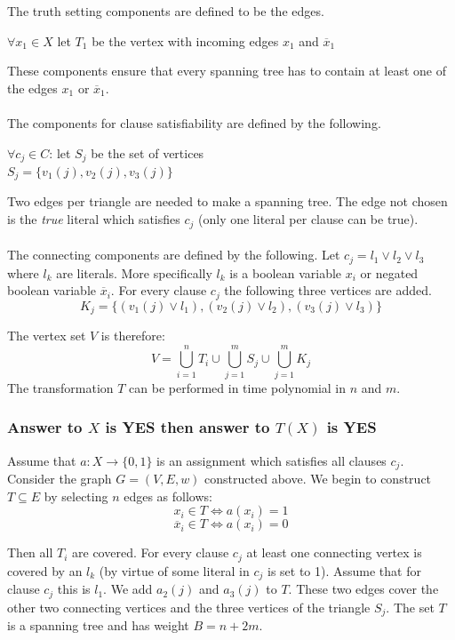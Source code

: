 \documentclass[12pt]{report}
\begin{document}
The truth setting components are defined to be the edges.
\begin{center}
	$\forall x_1 \in X$ let $T_1$ be the vertex with incoming edges $x_1$ and $\overline{x}_1$
\end{center}
These components ensure that every spanning tree has to contain at least one of the edges $x_1$ or $\overline{x}_1$.\\
\\
The components for clause satisfiability are defined by the following.
\begin{center}
	$\forall c_j \in C$: let $S_j$ be the set of vertices\\
	$S_j  = \{v_1(j),v_2(j),v_3(j)\}$
\end{center}
Two edges per triangle are needed to make a spanning tree. The edge not chosen is the \emph{true} literal which satisfies $c_j$ (only one literal per clause can be true).\\
\\
The connecting components are defined by the following. Let $c_j = l_1 \vee l_2 \vee l_3$ where $l_k$ are literals. More specifically $l_k$ is a boolean variable $x_i$ or negated boolean variable $\overline{x}_i$. For every clause $c_j$ the following three vertices are added.
$$K_j = \{(v_1(j) \vee l_1), (v_2(j) \vee l_2), (v_3(j) \vee l_3)\}$$

The vertex set $V$ is therefore:
$$V = \bigcup_{i=1}^{n}{T_i} \cup \bigcup_{j=1}^{m}{S_j} \cup \bigcup_{j=1}^{m}{K_j}$$
The transformation $T$ can be performed in time polynomial in $n$ and $m$.

\subsubsection{Answer to $X$ is YES then answer to $T(X)$ is YES}
Assume that $a: X \rightarrow \{0,1\}$ is an assignment which satisfies all clauses $c_j$. Consider the graph $G = (V,E,w)$ constructed above. We begin to construct $T \subseteq E$ by selecting $n$ edges as follows:
$$x_i \in T \Leftrightarrow a(x_i) = 1$$
$$\overline{x}_i \in T \Leftrightarrow a(x_i) = 0$$

Then all $T_i$ are covered. For every clause $c_j$ at least one connecting vertex is covered by an $l_k$ (by virtue of some literal in $c_j$ is set to 1). Assume that for clause $c_j$ this is $l_1$. We add $a_2(j)$ and $a_3(j)$ to $T$. These two edges cover the other two connecting vertices and the three vertices of the triangle $S_j$. The set $T$ is a spanning tree and has weight $B = n + 2m$.
\end{document}
